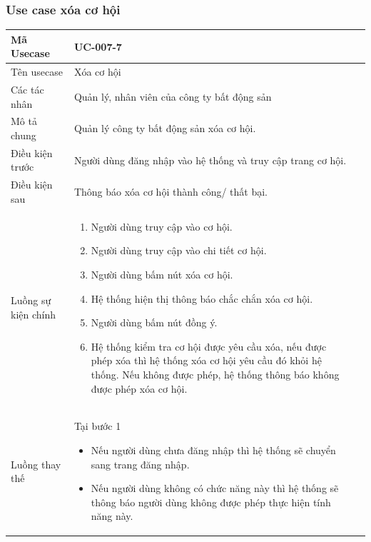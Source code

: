 \documentclass[12pt,a4paper]{article}
\begin{document}
    \subsubsection*{Use case xóa cơ hội}
    \begin{table}[H]
        \centering
        \begin{tabular}{|p{3.5cm}|p{11.5cm}|c|}
            \hline
            Mã Usecase      & UC-007-7                                                    \\
            \hline
            Tên usecase     & Xóa cơ hội                                                  \\
            \hline
            Các tác nhân    & Quản lý, nhân viên của công ty bất động sản                 \\
            \hline
            Mô tả chung     & Quản lý công ty bất động sản xóa cơ hội.                    \\
            \hline

            Điều kiện trước & Người dùng đăng nhập vào hệ thống và truy cập trang cơ hội. \\
            \hline

            Điều kiện sau   & Thông báo xóa cơ hội thành công/ thất bại.                  \\
            \hline

            Luồng sự kiện chính & \vspace{-.8cm}\begin{enumerate}
                                                    \item Người dùng truy cập vào cơ hội.
                                                    \item Người dùng truy cập vào chi tiết cơ hội.
                                                    \item  Người dùng bấm nút xóa cơ hội.
                                                    \item  Hệ thống hiện thị thông báo chắc chắn xóa cơ hội.
                                                    \item  Người dùng bấm nút đồng ý.
                                                    \item Hệ thống kiểm tra cơ hội được yêu cầu xóa, nếu được phép xóa thì hệ thống xóa cơ hội yêu cầu đó khỏi hệ thống. Nếu không được phép, hệ thống thông báo không được phép xóa cơ hội.
            \end{enumerate}
            \\
            \hline
            Luồng thay thế & Tại bước 1\newline
            \vspace{-.8cm}\begin{itemize}
                              \item Nếu người dùng chưa đăng nhập thì hệ thống sẽ chuyển sang trang đăng nhập.
                              \item Nếu người dùng không có chức năng này thì hệ thống sẽ thông báo người dùng không được phép thực hiện tính năng này.
            \end{itemize}


\end{tabular}
\end{table}
\end{document}
